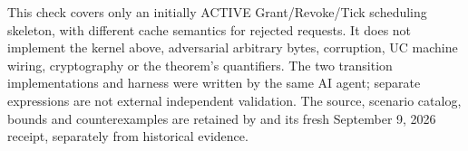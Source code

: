 This check covers only an initially ACTIVE Grant/Revoke/Tick scheduling
skeleton, with different cache semantics for rejected requests. It does
not implement the kernel above, adversarial arbitrary bytes, corruption,
UC machine wiring, cryptography or the theorem's quantifiers.
The two transition implementations and harness were written by the same
AI agent; separate expressions are not external independent validation.
The source, scenario catalog, bounds and counterexamples are retained by
 and its fresh
September 9, 2026 receipt, separately from historical evidence.
